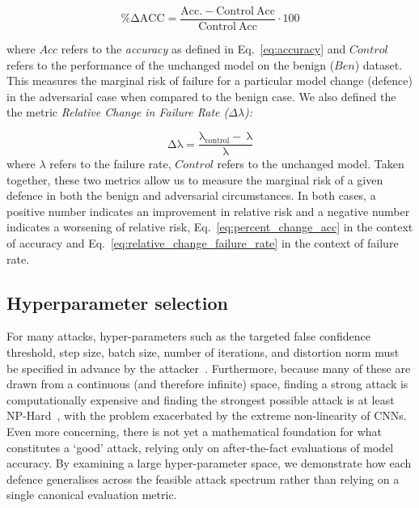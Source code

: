\documentclass[journal]{IEEEtran}
\begin{document}
\begin{equation}
    \label{eq:percent_change_acc}
    \mathrm{\%\Delta ACC =
        \frac{Acc.-Control~Acc}{Control~Acc}} \cdot 100
\end{equation}

where $Acc$ refers to the \textit{accuracy} as defined in Eq.~\ref{eq:accuracy} and $Control$ refers to the performance of the unchanged model on the benign ($Ben$) dataset.
This measures the marginal risk of failure for a particular model change (defence) in the adversarial case when compared to the benign case.
We also defined the the metric \textit{Relative Change in Failure Rate ($ \Delta \lambda$):}

\begin{equation}
\label{eq:relative_change_failure_rate}
\mathrm{\Delta \lambda} =
    \frac{\mathrm{\lambda_{control}-~\lambda}}{\mathrm{\lambda}}
\end{equation}
where $\lambda$ refers to the failure rate, $Control$ refers to the unchanged model.
Taken together, these two metrics allow us to measure the marginal risk of a given defence in both the benign and adversarial circumstances.
In both cases, a positive number indicates an improvement in relative risk and a negative number indicates a worsening of relative risk, Eq.~\ref{eq:percent_change_acc} in the context of accuracy and Eq.~\ref{eq:relative_change_failure_rate} in the context of failure rate.

\subsection{Hyperparameter selection}

For many attacks, hyper-parameters such as the targeted false confidence threshold, step size, batch size, number of iterations, and distortion norm must be specified in advance by the attacker~\cite{carlini_towards_2017}.
Furthermore, because many of these are drawn from a continuous (and therefore infinite) space, finding a strong attack is computationally expensive and finding the strongest possible attack is at least NP-Hard~\cite{carlini_towards_2017}, with the problem exacerbated by the extreme non-linearity of CNNs.
Even more concerning, there is not yet a mathematical foundation for what constitutes a `good' attack, relying only on after-the-fact evaluations of model accuracy.
By examining a large hyper-parameter space, we demonstrate how each defence generalises across the feasible attack spectrum rather than relying on a single canonical evaluation metric.
\end{document}
